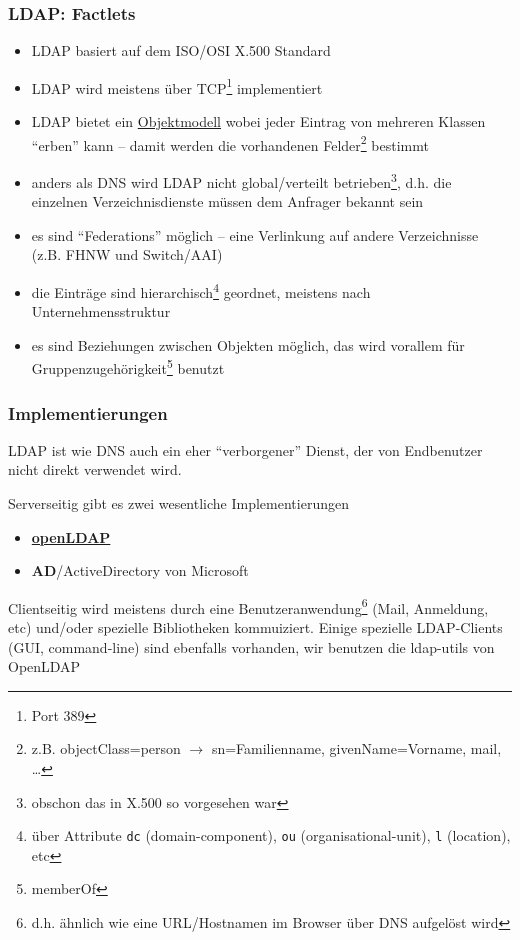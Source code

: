 \documentclass[ignorenonframetext]{beamer}
\begin{document}
\begin{frame}
\frametitle{LDAP: Factlets}
\begin{itemize}
	\item LDAP basiert auf dem ISO/OSI X.500 Standard
	\item LDAP wird meistens \"uber TCP\footnote{Port 389} implementiert
	\item LDAP bietet ein \href{https://ldap.com/object-classes/}{Objektmodell} wobei jeder Eintrag von mehreren Klassen ``erben'' kann -- damit werden die vorhandenen Felder\footnote{z.B. objectClass=person $\rightarrow$ sn=Familienname, givenName=Vorname, mail, \ldots} bestimmt
	\item anders als DNS wird LDAP nicht global/verteilt betrieben\footnote{obschon das
	in X.500 so vorgesehen war}, d.h. die einzelnen Verzeichnisdienste m\"ussen dem Anfrager bekannt sein
	\item es sind ``Federations'' m\"oglich -- eine Verlinkung auf andere Verzeichnisse (z.B. FHNW und Switch/AAI)
	\item die Eintr\"age sind hierarchisch\footnote{\"uber Attribute \texttt{dc} (domain-component), \texttt{ou} (organisational-unit), \texttt{l} (location), etc} geordnet, meistens nach Unternehmensstruktur
	\item es sind Beziehungen zwischen Objekten m\"oglich, das wird vorallem f\"ur Gruppenzugeh\"origkeit\footnote{memberOf} benutzt
\end{itemize}
\end{frame}



\begin{frame}
\frametitle{Implementierungen}
LDAP ist wie DNS auch ein eher ``verborgener'' Dienst, der von Endbenutzer nicht
direkt verwendet wird.

\vspace{0.25cm}
Serverseitig gibt es zwei wesentliche Implementierungen
\begin{itemize}
	\item \href{https://openldap.org}{\textbf{openLDAP}}
	\item \textbf{AD}/ActiveDirectory von Microsoft
\end{itemize}
\vspace{0.5cm}
Clientseitig wird meistens durch eine Benutzeranwendung\footnote{d.h. \"ahnlich wie eine URL/Hostnamen im Browser \"uber DNS aufgel\"ost wird} (Mail, Anmeldung, etc) und/oder
spezielle Bibliotheken kommuiziert.
\vspace{0.5cm}
Einige spezielle LDAP-Clients (GUI, command-line) sind ebenfalls vorhanden, wir
benutzen die ldap-utils von OpenLDAP
\end{frame}
\end{document}
